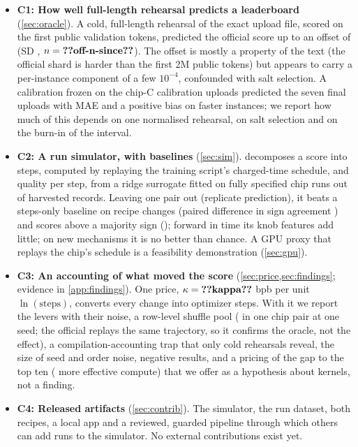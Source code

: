 \begin{itemize}
  \item \textbf{C1: How well full-length rehearsal predicts a leaderboard} (\cref{sec:oracle}). A cold,
    full-length rehearsal of the exact upload file, scored on the first  public validation tokens,
    predicted the official score up to an offset of  (SD , $n=\val{off-n-since}$).
    The offset is mostly a property of the text (the official shard is harder than the first 2M public tokens) but appears to carry
    a per-instance component of a few $10^{-4}$, confounded with salt selection. A calibration frozen on the chip-C
    calibration uploads predicted the seven final uploads with MAE  and a positive bias on faster
    instances; we report how much of this depends on one normalised rehearsal, on salt selection and on the burn-in of
    the interval.
  \item \textbf{C2: A run simulator, with baselines} (\cref{sec:sim}). \ffsim{} decomposes a score into steps,
    computed by replaying the training script's charged-time schedule, and quality per step, from a ridge surrogate
    fitted on  fully specified chip runs out of  harvested records. Leaving one pair out
    (replicate prediction), it beats a steps-only baseline on recipe changes (paired difference in sign agreement
    ) and scores above a majority sign (); forward in time its knob
    features add little; on new mechanisms it is no better than chance. A GPU proxy that replays the chip's schedule
    is a feasibility demonstration (\cref{sec:gpu}).
  \item \textbf{C3: An accounting of what moved the score} (\cref{sec:price,sec:findings}; evidence in
    \cref{app:findings}). One price,
    $\kappa=\val{kappa}$ bpb per unit $\ln(\text{steps})$, converts every change into optimizer steps. With it we
    report the levers with their noise, a row-level shuffle pool (\docnum{} in one chip pair at
    one seed; the official  replays the same trajectory, so it confirms the oracle, not the
    effect), a compilation-accounting trap that only cold rehearsals reveal, the size of seed and order noise,
    negative results, and a pricing of the gap to the top ten ( more effective compute) that we
    offer as a hypothesis about kernels, not a finding.
  \item \textbf{C4: Released artifacts} (\cref{sec:contrib}). The simulator, the run dataset, both recipes, a
    local app and a reviewed, guarded pipeline through which others can add runs to the simulator. No external
    contributions exist yet.
\end{itemize}

